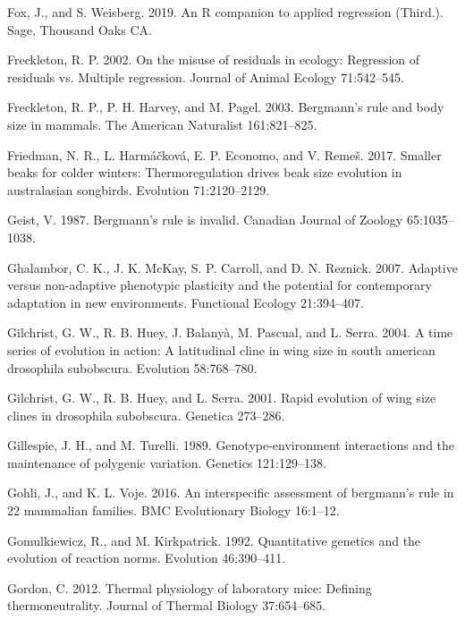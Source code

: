 \documentclass[]{article}
\begin{document}
\leavevmode\hypertarget{ref-Fox2019}{}%
Fox, J., and S. Weisberg. 2019. An R companion to applied regression
(Third.). Sage, Thousand Oaks CA.

\leavevmode\hypertarget{ref-Freckleton2002}{}%
Freckleton, R. P. 2002. On the misuse of residuals in ecology:
Regression of residuals vs. Multiple regression. Journal of Animal
Ecology 71:542--545.

\leavevmode\hypertarget{ref-Freckleton2003}{}%
Freckleton, R. P., P. H. Harvey, and M. Pagel. 2003. Bergmann's rule and
body size in mammals. The American Naturalist 161:821--825.

\leavevmode\hypertarget{ref-Friedman2017}{}%
Friedman, N. R., L. Harmáčková, E. P. Economo, and V. Remeš. 2017.
Smaller beaks for colder winters: Thermoregulation drives beak size
evolution in australasian songbirds. Evolution 71:2120--2129.

\leavevmode\hypertarget{ref-Geist1987}{}%
Geist, V. 1987. Bergmann's rule is invalid. Canadian Journal of Zoology
65:1035--1038.

\leavevmode\hypertarget{ref-Ghalambor2007}{}%
Ghalambor, C. K., J. K. McKay, S. P. Carroll, and D. N. Reznick. 2007.
Adaptive versus non-adaptive phenotypic plasticity and the potential for
contemporary adaptation in new environments. Functional Ecology
21:394--407.

\leavevmode\hypertarget{ref-Gilchrist2004a}{}%
Gilchrist, G. W., R. B. Huey, J. Balanyà, M. Pascual, and L. Serra.
2004. A time series of evolution in action: A latitudinal cline in wing
size in south american drosophila subobscura. Evolution 58:768--780.

\leavevmode\hypertarget{ref-Gilchrist2001}{}%
Gilchrist, G. W., R. B. Huey, and L. Serra. 2001. Rapid evolution of
wing size clines in drosophila subobscura. Genetica 273--286.

\leavevmode\hypertarget{ref-Gillespie1989}{}%
Gillespie, J. H., and M. Turelli. 1989. Genotype-environment
interactions and the maintenance of polygenic variation. Genetics
121:129--138.

\leavevmode\hypertarget{ref-Gohli2016}{}%
Gohli, J., and K. L. Voje. 2016. An interspecific assessment of
bergmann's rule in 22 mammalian families. BMC Evolutionary Biology
16:1--12.

\leavevmode\hypertarget{ref-Gomulkiewicz1992}{}%
Gomulkiewicz, R., and M. Kirkpatrick. 1992. Quantitative genetics and
the evolution of reaction norms. Evolution 46:390--411.

\leavevmode\hypertarget{ref-Gordon2012}{}%
Gordon, C. 2012. Thermal physiology of laboratory mice: Defining
thermoneutrality. Journal of Thermal Biology 37:654--685.
\end{document}
